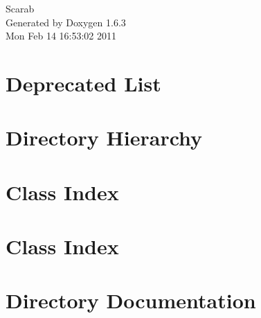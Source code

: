 \documentclass[a4paper]{book}
\begin{document}
\hypersetup{pageanchor=false}
\begin{titlepage}
\vspace*{7cm}
\begin{center}
{\Large Scarab }\\
\vspace*{1cm}
{\large Generated by Doxygen 1.6.3}\\
\vspace*{0.5cm}
{\small Mon Feb 14 16:53:02 2011}\\
\end{center}
\end{titlepage}
\clearemptydoublepage
{}
\tableofcontents
\clearemptydoublepage
{}
\hypersetup{pageanchor=true}
\chapter{Deprecated List}
\label{deprecated}
\hypertarget{deprecated}{}

\chapter{Directory Hierarchy}

\chapter{Class Index}

\chapter{Class Index}

\chapter{Directory Documentation}










\end{document}
